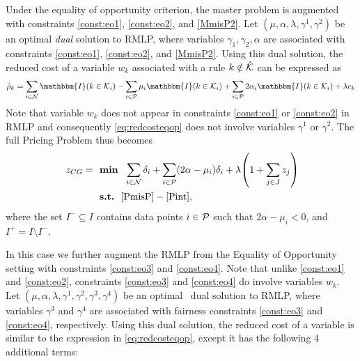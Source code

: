 \documentclass[twoside,11pt]{article}
\begin{document}
Under the equality of opportunity criterion, the master problem is augmented with constraints \eqref{const:eo1}, \eqref{const:eo2}, and \eqref{MmisP2}. Let $(\mu,\alpha,\lambda,\gamma^1,\gamma^2)$ be an optimal {\em dual} solution to RMLP, where variables $\gamma_1, \gamma_2,\alpha $ are associated with constraints \eqref{const:eo1},  \eqref{const:eo2}, and \eqref{MmisP2}. Using this dual solution, the reduced cost of a variable $w_k$ associated with a rule $k\notin\hat{\mathcal{K}}$ can be expressed as
\begin{equation}
\hat \rho_k =  \sum_{i \in \mathcal{N}} \mathbbm{I}(k \in {\cal K}_i)
-\sum_{i \in \mathcal{P}}  \mu_i \mathbbm{I}(k \in {\cal K}_i)
+ \sum_{i \in \mathcal{P}} 2 \alpha_i \mathbbm{I}(k \in {\cal K}_i) +\lambda  c_k  \label{eq:redcosteqop}
\end{equation}
Note that variable $w_k$ does not appear in constraints \eqref{const:eo1} or  \eqref{const:eo2}  in  RMLP and consequently \eqref{eq:redcosteqop} does not involve variables $\gamma^1$ or $\gamma^2$. The full Pricing Problem thus becomes
    \begin{align*}
	~z_{CG} = ~~&\textbf{min} ~~  
	  \sum_{i \in \mathcal{N}} \delta_i + \sum_{i \in \mathcal{P}} (2 \alpha - \mu_i) \delta_i + 
     \lambda\left(1 + \sum_{j \in J} z_j\right)  
	\\	&\textbf{s.t.} ~~\eqref{PmisP}-\eqref{Pint},
	\end{align*}
 where the set $I^-\subseteq I$ contains data points $i \in {\cal P}$ such that $2\alpha - \mu_i < 0$, and $I^+=I\setminus I^-$. 


In this case we further augment the RMLP from the Equality of Opportunity setting with constraints \eqref{const:eo3} and  \eqref{const:eo4}. Note that unlike  \eqref{const:eo1} and  \eqref{const:eo2}, constraints \eqref{const:eo3} and  \eqref{const:eo4} do involve variables $w_k$.
Let $(\mu,\alpha,\lambda,\gamma^1,\gamma^2,\gamma^3,\gamma^4)$ be an optimal {\ dual} solution to RMLP, where variables  $\gamma^3$ and $\gamma^4$ are associated with fairness constraints \eqref{const:eo3} and  \eqref{const:eo4}, respectively.
Using this dual solution, the reduced cost of a variable is similar to the expression in \eqref{eq:redcosteqop}, except it has the following 4 additional terms:
\end{document}
